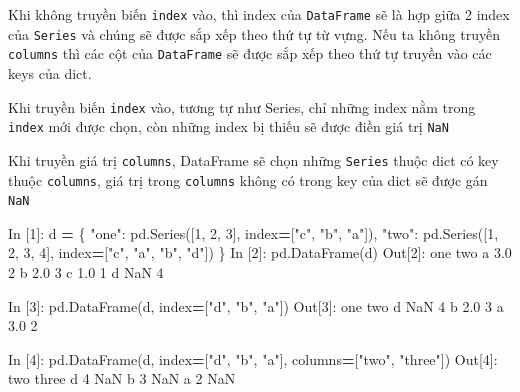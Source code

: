 \documentclass[
]{book}
\newenvironment{Shaded}{\begin{snugshade}}{\end{snugshade}}
\newcommand{\DecValTok}[1]{\textcolor[rgb]{0.00,0.00,0.81}{#1}}
\newcommand{\FloatTok}[1]{\textcolor[rgb]{0.00,0.00,0.81}{#1}}
\newcommand{\NormalTok}[1]{#1}
\newcommand{\OperatorTok}[1]{\textcolor[rgb]{0.81,0.36,0.00}{\textbf{#1}}}
\newcommand{\StringTok}[1]{\textcolor[rgb]{0.31,0.60,0.02}{#1}}
\begin{document}
Khi không truyền biến \texttt{index} vào, thì index của \texttt{DataFrame} sẽ là hợp giữa 2 index của \texttt{Series} và
chúng sẽ được sắp xếp theo thứ tự từ vựng. Nếu ta không truyền \texttt{columns} thì các cột của \texttt{DataFrame} sẽ
được sắp xếp theo thứ tự truyền vào các keys của dict.

Khi truyền biến \texttt{index} vào, tương tự như Series, chỉ những index nằm trong \texttt{index} mới được chọn, còn
những index bị thiếu sẽ được điền giá trị \texttt{NaN}

Khi truyền giá trị \texttt{columns}, DataFrame sẽ chọn những \texttt{Series} thuộc dict có key thuộc \texttt{columns}, giá trị
trong \texttt{columns} không có trong key của dict sẽ được gán \texttt{NaN}

\begin{Shaded}
\begin{Highlighting}[]
\NormalTok{In [}\DecValTok{1}\NormalTok{]: d }\OperatorTok{=}\NormalTok{ \{}
            \StringTok{"one"}\NormalTok{: pd.Series([}\DecValTok{1}\NormalTok{, }\DecValTok{2}\NormalTok{, }\DecValTok{3}\NormalTok{], index}\OperatorTok{=}\NormalTok{[}\StringTok{"c"}\NormalTok{, }\StringTok{"b"}\NormalTok{, }\StringTok{"a"}\NormalTok{]),}
            \StringTok{"two"}\NormalTok{: pd.Series([}\DecValTok{1}\NormalTok{, }\DecValTok{2}\NormalTok{, }\DecValTok{3}\NormalTok{, }\DecValTok{4}\NormalTok{], index}\OperatorTok{=}\NormalTok{[}\StringTok{"c"}\NormalTok{, }\StringTok{"a"}\NormalTok{, }\StringTok{"b"}\NormalTok{, }\StringTok{"d"}\NormalTok{])}
\NormalTok{        \}}
\NormalTok{In [}\DecValTok{2}\NormalTok{]: pd.DataFrame(d)}
\NormalTok{Out[}\DecValTok{2}\NormalTok{]:}
\NormalTok{   one  two}
\NormalTok{a  }\FloatTok{3.0}    \DecValTok{2}
\NormalTok{b  }\FloatTok{2.0}    \DecValTok{3}
\NormalTok{c  }\FloatTok{1.0}    \DecValTok{1}
\NormalTok{d  NaN    }\DecValTok{4}

\NormalTok{In [}\DecValTok{3}\NormalTok{]: pd.DataFrame(d, index}\OperatorTok{=}\NormalTok{[}\StringTok{"d"}\NormalTok{, }\StringTok{"b"}\NormalTok{, }\StringTok{"a"}\NormalTok{])}
\NormalTok{Out[}\DecValTok{3}\NormalTok{]: }
\NormalTok{   one  two}
\NormalTok{d  NaN    }\DecValTok{4}
\NormalTok{b  }\FloatTok{2.0}    \DecValTok{3}
\NormalTok{a  }\FloatTok{3.0}    \DecValTok{2}

\NormalTok{In [}\DecValTok{4}\NormalTok{]: pd.DataFrame(d, index}\OperatorTok{=}\NormalTok{[}\StringTok{"d"}\NormalTok{, }\StringTok{"b"}\NormalTok{, }\StringTok{"a"}\NormalTok{], columns}\OperatorTok{=}\NormalTok{[}\StringTok{"two"}\NormalTok{, }\StringTok{"three"}\NormalTok{])}
\NormalTok{Out[}\DecValTok{4}\NormalTok{]:}
\NormalTok{   two  three}
\NormalTok{d    }\DecValTok{4}\NormalTok{    NaN}
\NormalTok{b    }\DecValTok{3}\NormalTok{    NaN}
\NormalTok{a    }\DecValTok{2}\NormalTok{    NaN}
\end{Highlighting}
\end{Shaded}
\end{document}
